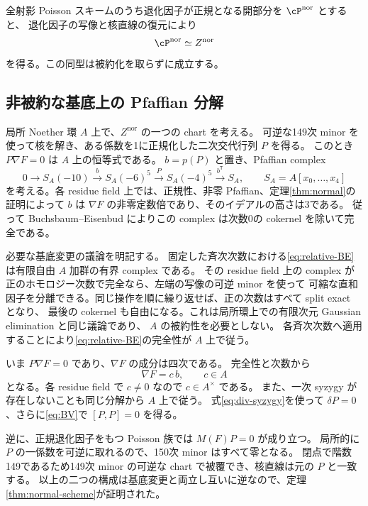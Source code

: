 \begin{theorem}[全スキームの同型]\label{thm:normal-scheme}
全射影 Poisson スキームのうち退化因子が正規となる開部分を $\cP^{\mathrm{nor}}$ とすると、
退化因子の写像と核直線の復元により
\[
                    \cP^{\mathrm{nor}}\simeq Z^{\mathrm{nor}}
\]
を得る。この同型は被約化を取らずに成立する。
\end{theorem}

\subsection{非被約な基底上の Pfaffian 分解}

局所 Noether 環 $A$ 上で、$Z^{\mathrm{nor}}$ の一つの chart を考える。
可逆な149次 minor を使って核を解き、ある係数を1に正規化した二次交代行列 $P$ を得る。
このとき $P\nabla F=0$ は $A$ 上の恒等式である。
$b=p(P)$ と置き、Pfaffian complex
\begin{equation}\label{eq:relative-BE}
 0\longrightarrow S_A(-10)\xrightarrow{b}S_A(-6)^5
 \xrightarrow{P}S_A(-4)^5\xrightarrow{b^{\mathsf T}}S_A,
 \qquad S_A=A[x_0,\ldots,x_4]
\end{equation}
を考える。各 residue field 上では、正規性、非零 Pfaffian、定理\ref{thm:normal}の証明によって
$b$ は $\nabla F$ の非零定数倍であり、そのイデアルの高さは3である。
従って Buchsbaum--Eisenbud によりこの complex は次数0の cokernel を除いて完全である。

必要な基底変更の議論を明記する。
固定した斉次次数における\eqref{eq:relative-BE}は有限自由 $A$ 加群の有界 complex である。
その residue field 上の complex が正のホモロジー次数で完全なら、左端の写像の可逆 minor を使って
可縮な直和因子を分離できる。同じ操作を順に繰り返せば、正の次数はすべて split exact となり、
最後の cokernel も自由になる。これは局所環上での有限次元 Gaussian elimination と同じ議論であり、
$A$ の被約性を必要としない。
各斉次次数へ適用することにより\eqref{eq:relative-BE}の完全性が $A$ 上で従う。

いま $P\nabla F=0$ であり、$\nabla F$ の成分は四次である。
完全性と次数から
\[
                        \nabla F=c\,b,\qquad c\in A
\]
となる。各 residue field で $c\ne0$ なので $c\in A^\times$ である。
また、一次 syzygy が存在しないことも同じ分解から $A$ 上で従う。
式\eqref{eq:div-syzygy}を使って $\delta P=0$、さらに\eqref{eq:BV}で $[P,P]=0$ を得る。

逆に、正規退化因子をもつ Poisson 族では $M(F)P=0$ が成り立つ。
局所的に $P$ の一係数を可逆に取れるので、150次 minor はすべて零となる。
閉点で階数149であるため149次 minor の可逆な chart で被覆でき、核直線は元の $P$ と一致する。
以上の二つの構成は基底変更と両立し互いに逆なので、定理\ref{thm:normal-scheme}が証明された。

